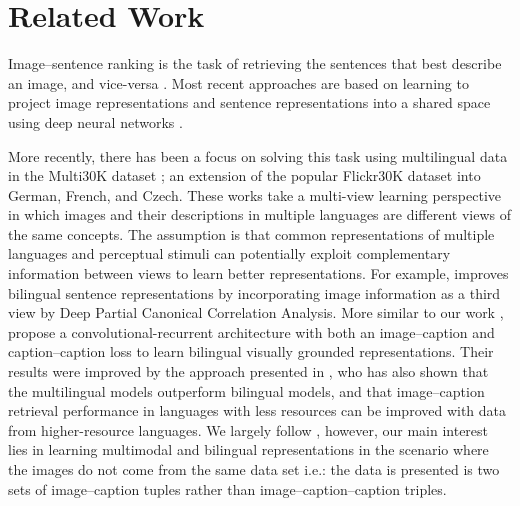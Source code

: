 \section{Related Work}


Image--sentence ranking is the task of retrieving the sentences that best describe an image, and vice-versa \citep{hodosh2013framing}. Most recent approaches are based on learning to project image representations and sentence representations into a shared space using deep neural networks \citep[\textit{inter-alia}]{frome2013devise,socher2014grounded,vendrov2016order,faghri2017vse++}. 

More recently, there has been a focus on solving this task using multilingual data \citep{gella2017image,kadar2018conll} in the Multi30K dataset \citep{W16-3210}; an extension of the popular Flickr30K dataset into German, French, and Czech.
These works take a multi-view learning perspective in which 
images and their descriptions in multiple languages are different views of the
same concepts. The assumption is that common representations of multiple languages and perceptual stimuli 
can potentially exploit complementary information
between views to learn better representations. 
For example, \cite{rotman2018bridging} improves bilingual sentence representations by incorporating image information as a third view by Deep Partial Canonical Correlation Analysis.
More similar to our work 
\cite{gella2017image}, propose a convolutional-recurrent architecture with both an image--caption
and caption--caption loss to learn bilingual visually grounded representations. 
Their results were improved by the approach presented in \cite{kadar2018conll}, who has also
shown that the multilingual models outperform bilingual models, and that image--caption retrieval 
performance in languages with less resources can be improved with data from higher-resource
languages. We largely follow \cite{kadar2018conll}, however, our main interest lies in learning multimodal
and bilingual representations in the scenario where the images do not come from the same
data set i.e.: the data is presented is two sets of image--caption tuples rather than
image--caption--caption triples.

